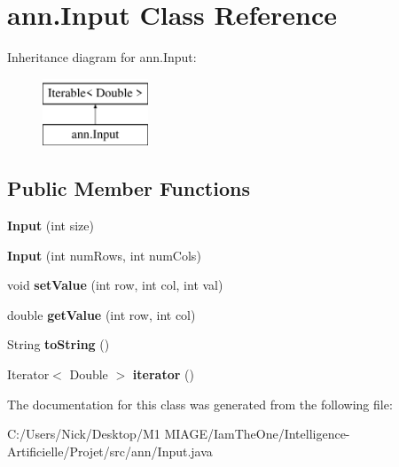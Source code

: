 \hypertarget{classann_1_1_input}{}\section{ann.\+Input Class Reference}
\label{classann_1_1_input}
Inheritance diagram for ann.\+Input\+:\begin{figure}[H]
\begin{center}
\leavevmode
\includegraphics[height=2.000000cm]{classann_1_1_input}
\end{center}
\end{figure}
\subsection*{Public Member Functions}
\begin{DoxyCompactItemize}
\item 
\mbox{\label{classann_1_1_input_a58e4d4bd454620c64b162792f05398a8}} 
{\bfseries Input} (int size)
\item 
\mbox{\label{classann_1_1_input_a56db4af5fd8a2888e14cf6610b1b9067}} 
{\bfseries Input} (int num\+Rows, int num\+Cols)
\item 
\mbox{\label{classann_1_1_input_ac57941ba7f3a4562e90d4a686e274cb6}} 
void {\bfseries set\+Value} (int row, int col, int val)
\item 
\mbox{\label{classann_1_1_input_a997d6cbb6b015e32b884f1763c3709c2}} 
double {\bfseries get\+Value} (int row, int col)
\item 
\mbox{\label{classann_1_1_input_a10cf38f57f0f5351e99c3ad997035b4c}} 
String {\bfseries to\+String} ()
\item 
\mbox{\label{classann_1_1_input_abde8c7c03ebcaceebc918afb3d3a49e1}} 
Iterator$<$ Double $>$ {\bfseries iterator} ()
\end{DoxyCompactItemize}


The documentation for this class was generated from the following file\+:\begin{DoxyCompactItemize}
\item 
C\+:/\+Users/\+Nick/\+Desktop/\+M1 M\+I\+A\+G\+E/\+Iam\+The\+One/\+Intelligence-\/\+Artificielle/\+Projet/src/ann/Input.\+java\end{DoxyCompactItemize}
